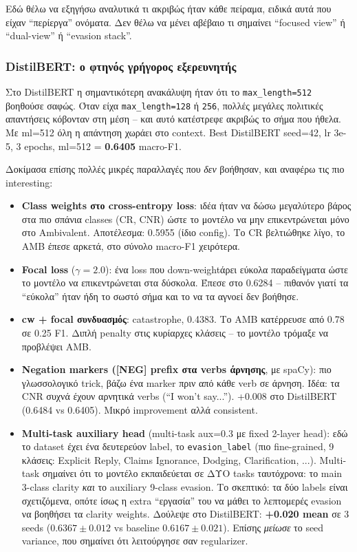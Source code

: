 \documentclass[12pt]{fphw}
\begin{document}
Εδώ θέλω να εξηγήσω αναλυτικά τι ακριβώς ήταν κάθε πείραμα, ειδικά αυτά που είχαν ``περίεργα'' ονόματα. Δεν θέλω να μένει αβέβαιο τι σημαίνει ``focused view'' ή ``dual-view'' ή ``evasion stack''.

\subsubsection{DistilBERT: ο φτηνός γρήγορος εξερευνητής}

Στο DistilBERT η σημαντικότερη ανακάλυψη ήταν ότι το \texttt{max\_length=512} βοηθούσε σαφώς. Όταν είχα \texttt{max\_length=128} ή \texttt{256}, πολλές μεγάλες πολιτικές απαντήσεις κόβονταν στη μέση -- και αυτό κατέστρεφε ακριβώς το σήμα που ήθελα. Με ml=512 όλη η απάντηση χωράει στο context. Best DistilBERT seed=42, lr 3e-5, 3 epochs, ml=512 = \textbf{0.6405} macro-F1.

Δοκίμασα επίσης πολλές μικρές παραλλαγές που \emph{δεν} βοήθησαν, και αναφέρω τις πιο interesting:

\begin{itemize}
    \item \textbf{Class weights στο cross-entropy loss}: ιδέα ήταν να δώσω μεγαλύτερο βάρος στα πιο σπάνια classes (CR, CNR) ώστε το μοντέλο να μην επικεντρώνεται μόνο στο Ambivalent. Αποτέλεσμα: 0.5955 (ίδιο config). Το CR βελτιώθηκε λίγο, το AMB έπεσε αρκετά, στο σύνολο macro-F1 χειρότερα.
    \item \textbf{Focal loss} ($\gamma=2.0$): ένα loss που down-weightάρει εύκολα παραδείγματα ώστε το μοντέλο να επικεντρώνεται στα δύσκολα. Έπεσε στο 0.6284 -- πιθανόν γιατί τα ``εύκολα'' ήταν ήδη το σωστό σήμα και το να τα αγνοεί δεν βοήθησε.
    \item \textbf{cw + focal συνδυασμός}: catastrophe, 0.4383. Το AMB κατέρρευσε από 0.78 σε 0.25 F1. Διπλή penalty στις κυρίαρχες κλάσεις -- το μοντέλο τρόμαξε να προβλέψει AMB.
    \item \textbf{Negation markers ([NEG] prefix στα verbs άρνησης}, με spaCy): πιο γλωσσολογικό trick, βάζω ένα marker πριν από κάθε verb σε άρνηση. Ιδέα: τα CNR συχνά έχουν αρνητικά verbs (``I won't say...''). +0.008 στο DistilBERT (0.6484 vs 0.6405). Μικρό improvement αλλά consistent.
    \item \textbf{Multi-task auxiliary head} (multi-task aux=0.3 με fixed 2-layer head): εδώ το dataset έχει ένα δευτερεύον label, το \texttt{evasion\_label} (πιο fine-grained, 9 κλάσεις: Explicit Reply, Claims Ignorance, Dodging, Clarification, ...). Multi-task σημαίνει ότι το μοντέλο εκπαιδεύεται σε ΔΥΟ tasks ταυτόχρονα: το main 3-class clarity \emph{και} το auxiliary 9-class evasion. Το σκεπτικό: τα δύο labels είναι σχετιζόμενα, οπότε ίσως η extra ``εργασία'' του να μάθει το λεπτομερές evasion να βοηθήσει τα clarity weights. Δούλεψε στο DistilBERT: \textbf{+0.020 mean} σε 3 seeds ($0.6367 \pm 0.012$ vs baseline $0.6167 \pm 0.021$). Επίσης \emph{μείωσε} το seed variance, που σημαίνει ότι λειτούργησε σαν regularizer.
\end{itemize}
\end{document}
